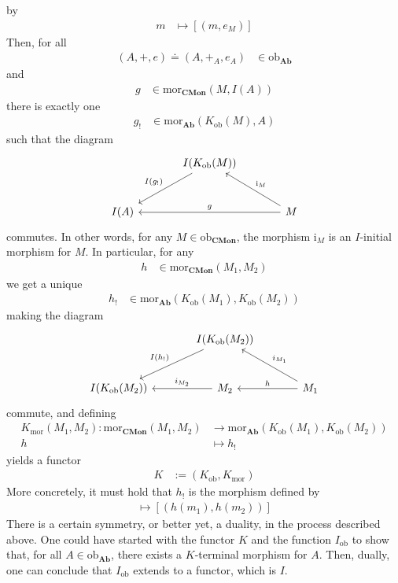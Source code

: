 \begin{exa}
by
\begin{align*}
  m
  &\mapsto
  [(m,e_{M})]
\end{align*}
Then, for all
\begin{align*}
  (A,+,e)
  \doteq
  (A,+_{A},e_{A})
  &\in
  \mathrm{ob}_{\mathbf{Ab}}
\end{align*}
and
\begin{align*}
  g
  &\in
  \mathrm{mor}_{\mathbf{CMon}}(M,I(A))
\end{align*}
there is exactly one
\begin{align*}
  g_{!}
  &\in
  \mathrm{mor}_{\mathbf{Ab}}(K_{\textrm{ob}}(M),A)
\end{align*}
such that the diagram
\[
\begin{tikzcd}[sep=large]
  &
  I(K_{\textrm{ob}}(M))
  \arrow[swap]{dl}{I(g_{!})}
  &
  \\
  I(A)
  &
  &
  M
  \arrow[swap]{ll}{g}
  \arrow[swap]{ul}{\mathrm{i}_{M}}
\end{tikzcd}
\]
commutes.
In other words, for any $M \in \mathrm{ob}_{\mathbf{CMon}}$, the morphism $\mathrm{i}_{M}$ is an $I$-initial morphism for $M$.
In particular, for any
\begin{align*}
  h
  &\in
  \mathrm{mor}_{\mathbf{CMon}}(M_{1},M_{2})
\end{align*}
we get a unique
\begin{align*}
  h_{!}
  &\in
  \mathrm{mor}_{\mathbf{Ab}}
  \left(
    K_{\textrm{ob}}(M_{1}),
    K_{\textrm{ob}}(M_{2})
  \right)
\end{align*}
making the diagram
\[
\begin{tikzcd}[sep=large]
  &
  I(K_{\textrm{ob}}(M_{2}))
  \arrow[swap]{dl}{I(h_{!})}  
  &
  \\
  I(K_{\textrm{ob}}(M_{2}))
  &
  M_{2}
  \arrow[swap]{l}{i_{M_{2}}}
  &
  M_{1}
  \arrow[swap]{l}{h}
  \arrow[swap]{ul}{i_{M_{1}}}
\end{tikzcd}
\]
commute, and defining
\begin{align*}
  K_{\mathrm{mor}}(M_{1},M_{2})
  \colon
  \mathrm{mor}_{\mathbf{CMon}}(M_{1},M_{2})
  &\rightarrow
  \mathrm{mor}_{\mathbf{Ab}}(K_{\mathrm{ob}}(M_{1}),K_{\mathrm{ob}}(M_{2}))
  \\
  h
  &\mapsto
  h_{!}
\end{align*}
yields a functor
\begin{align*}
  K
  &:=
  (K_{\mathrm{ob}},K_{\mathrm{mor}})
\end{align*}
More concretely, it must hold that $h_{!}$ is the morphism defined by
\begin{align*}
  [(m_{1},m_{2})]
  \mapsto
  [(h(m_{1}),h(m_{2}))]
\end{align*}
There is a certain symmetry, or better yet, a duality, in the process described above.
One could have started with the functor $K$ and the function $I_{\mathrm{ob}}$ to show that, for all $A \in \mathrm{ob}_{\mathbf{Ab}}$, there exists a $K$-terminal morphism for $A$.
Then, dually, one can conclude that $I_{\mathrm{ob}}$ extends to a functor, which is $I$.
\end{exa}
